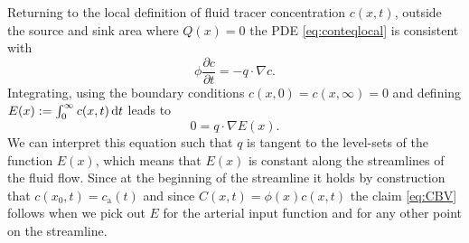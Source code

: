 \documentclass[journal,twocolumn]{IEEEtran}
\newcommand{\ca}{c_\mathrm{a}}
\begin{document}
	Returning to the local definition of fluid tracer concentration $c(x,t)$, outside the source and sink area where $Q(x)=0$ the PDE \eqref{eq:conteqlocal} is consistent with
	\begin{equation}
		\phi\frac{\partial c}{\partial t}  = - q \cdot \nabla c.
		\label{eq:1cmodel}
	\end{equation}
	Integrating, using the boundary conditions $c(x,0) = c(x,\infty) = 0$ and defining $E(x):= \int_0^\infty c(x,t) \,\mathrm{d} t$ leads to
	\begin{equation}
		0 = q \cdot \nabla  E(x).
		\label{eq:streamlinezero}
	\end{equation}
	We can interpret this equation such that $q$ is tangent to the level-sets of the function $E(x)$, which means that $E(x)$ is constant along the streamlines of the fluid flow.
	Since at the beginning of the streamline it holds by construction that $c(x_0,t) = \ca(t)$ and since $C(x,t) = \phi(x) c(x,t)$ the claim \eqref{eq:CBV} follows when we pick out $E$ for the arterial input function and for any other point on the streamline.
	
\end{document}
